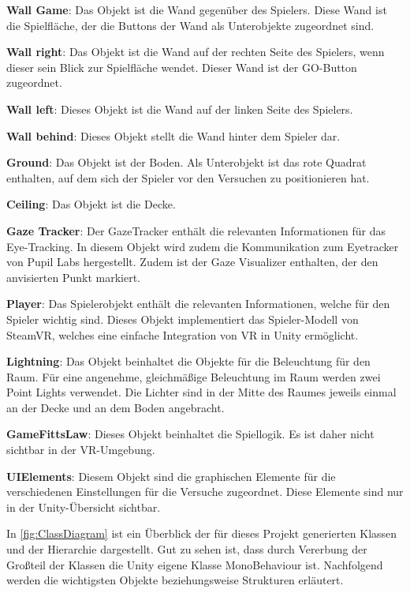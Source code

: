 \begin{description}
	\item \textbf{Wall Game}: Das Objekt ist die Wand gegenüber des Spielers. Diese Wand ist die Spielfläche, der die Buttons der Wand als Unterobjekte zugeordnet sind.
	\item \textbf{Wall right}: Das Objekt ist die Wand auf der rechten Seite des Spielers, wenn dieser sein Blick zur Spielfläche wendet. Dieser Wand ist der GO-Button zugeordnet.
	\item \textbf{Wall left}: Dieses Objekt ist die Wand auf der linken Seite des Spielers.
	\item \textbf{Wall behind}: Dieses Objekt stellt die Wand hinter dem Spieler dar.
	\item \textbf{Ground}: Das Objekt ist der Boden. Als Unterobjekt ist das rote Quadrat enthalten, auf dem sich der Spieler vor den Versuchen zu positionieren hat.
	\item \textbf{Ceiling}: Das Objekt ist die Decke.
	\item \textbf{Gaze Tracker}: Der GazeTracker enthält die relevanten Informationen für das Eye-Tracking. In diesem Objekt wird zudem die Kommunikation zum Eyetracker von Pupil Labs hergestellt. Zudem ist der Gaze Visualizer enthalten, der den anvisierten Punkt markiert.
	\item \textbf{Player}: Das Spielerobjekt enthält die relevanten Informationen, welche für den Spieler wichtig sind. Dieses Objekt implementiert das Spieler-Modell von SteamVR, welches eine einfache Integration von VR in Unity ermöglicht.
	\item \textbf{Lightning}: Das Objekt beinhaltet die Objekte für die Beleuchtung für den Raum. Für eine angenehme, gleichmäßige Beleuchtung im Raum werden zwei Point Lights verwendet. Die Lichter sind in der Mitte des Raumes jeweils einmal an der Decke und an dem Boden angebracht. 
	\item \textbf{GameFittsLaw}: Dieses Objekt beinhaltet die Spiellogik. Es ist daher nicht sichtbar in der \ac{VR}-Umgebung.
	\item \textbf{UIElements}: Diesem Objekt sind die graphischen Elemente für die verschiedenen Einstellungen für die Versuche zugeordnet. Diese Elemente sind nur in der Unity-Übersicht sichtbar. 
\end{description}

In \autoref{fig:ClassDiagram} ist ein Überblick der für dieses Projekt generierten Klassen und der Hierarchie dargestellt. Gut zu sehen ist, dass durch Vererbung der Großteil der Klassen die Unity eigene Klasse MonoBehaviour ist.  Nachfolgend werden die wichtigsten Objekte beziehungsweise Strukturen erläutert. 

